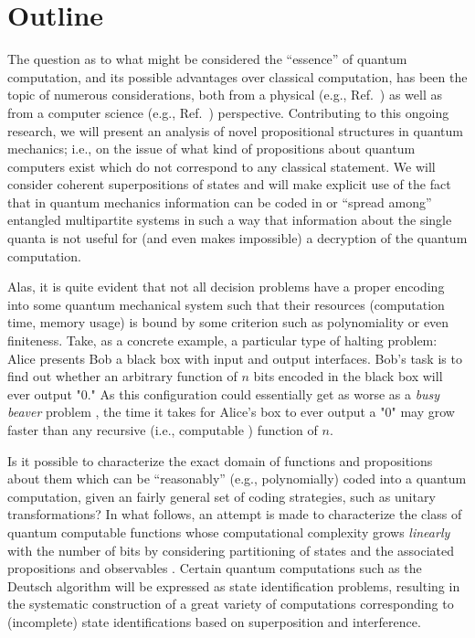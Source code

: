\maketitle



\section{Outline}

The question as to what might be considered the ``essence'' of quantum computation,
and its possible advantages over classical computation, has been the topic of
numerous considerations, both from a physical
(e.g., Ref.~\cite{ekerj96,pres-97,pres-ln,nielsen-book,galindo-02,mermin-04,eisert-wolf-04})
as well as from a computer science
(e.g., Ref.~\cite{Gruska,benn:97,Ozhigov:1997,bbcmw-01,cleve-99,fortnov-03}) perspective.
Contributing to this ongoing research,
we will present an analysis of novel propositional structures
in quantum mechanics; i.e.,
on the issue of what kind of propositions about
quantum computers exist which do not correspond to any classical statement.
We will consider coherent superpositions of  states and will
make explicit use of the fact that in quantum mechanics information
can be coded in or ``spread among'' entangled multipartite systems in such a way that
information about the single quanta is not useful for (and even makes impossible)
a decryption of the quantum computation.


Alas, it is quite evident that not all decision problems
have a proper encoding
into some quantum mechanical system
such that their resources (computation time, memory usage) is bound by some
criterion such as polynomiality or even finiteness.
Take, as a concrete example, a particular type of halting problem:
Alice presents Bob a black box with input and output interfaces.
Bob's task is to find out whether an arbitrary function of $n$ bits encoded in the black box
will ever output "0."
As this configuration could essentially get as worse as a {\em busy beaver} problem
\cite{rado},
the time it takes for Alice's box to ever output a "0" may grow faster than
any recursive (i.e., computable \cite{rogers1,odi:89}) function of $n$.



Is it possible to
characterize the exact domain of functions
and propositions about them which can be ``reasonably''
(e.g., polynomially) coded into a quantum computation,
given an fairly general set of coding strategies, such as unitary transformations?
In what follows, an attempt is made to characterize the class of quantum computable functions whose
computational complexity grows {\em linearly} with the number of bits
by considering partitioning of states and the associated propositions and observables
\cite{zeil-99,DonSvo01,svozil-2002-statepart-prl,svozil-2003-garda}.
Certain quantum computations such as the Deutsch algorithm
will be expressed as state identification problems,
resulting in the systematic construction of a great variety of computations
corresponding to (incomplete) state identifications
based on superposition and interference.

